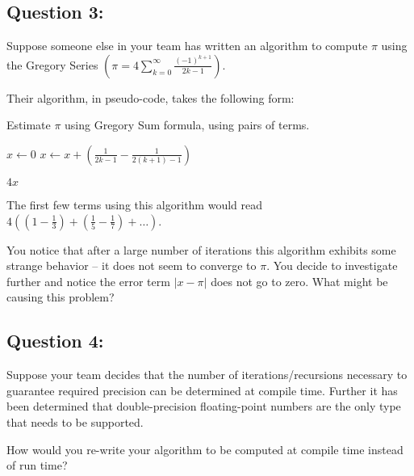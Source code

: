 \documentclass[letterpaper,11pt]{article}
\begin{document}
\subsection*{Question 3:}

Suppose someone else in your team has written an algorithm to compute $\pi$
 using the Gregory Series $ \left( \pi = 4 \sum_{k=0}^{\infty} \frac{ (-1)^{k+1} }{ 2k - 1 } \right)$.

Their algorithm, in pseudo-code, takes the following form:

 \FloatBarrier
 \begin{algorithm}[!htbp]
   \caption{ Estimate $\pi$ using Gregory Sum formula, using pairs of terms.}
   \begin{algorithmic}[1]
    \State $x \gets 0$
      \State $x \gets x + \left( \frac{1}{2k-1} - \frac{1}{2( k + 1 ) -1} \right)$
     \EndFor
   \end{algorithmic}
   \Return $4 x$
 \end{algorithm}
 \FloatBarrier

The first few terms using this algorithm would read $
4( ( 1 - \frac{1}{3} ) + ( \frac{1}{5} - \frac{1}{7} ) + \dots )$.

You notice that after a large number of iterations this algorithm exhibits some strange
 behavior -- it does not seem to converge to $\pi$. You decide to investigate further
 and notice the error term $\lvert x - \pi \rvert$ does not go to zero. What
  might be causing this problem?

\subsection*{Question 4:}

Suppose your team decides that the number of iterations/recursions necessary
to guarantee required precision can be determined
 at compile time. Further it has been determined that
 double-precision floating-point numbers are the only type that needs to be
 supported.

 How would you re-write your algorithm to be
 computed at compile time instead of run time?
\end{document}
